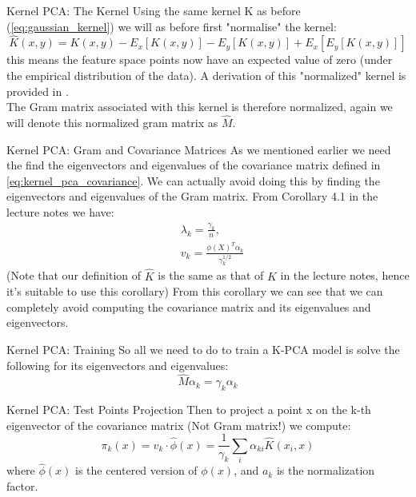 \documentclass[aspectratio=169]{beamer}
\begin{document}
\begin{frame}{Kernel PCA: The Kernel}
  Using the same kernel K as before (\cref{eq:gaussian_kernel}) we will as before first "normalise" the kernel:
  \begin{equation} \label{eq:kernel_normalization_kpca}
    \hat{K}(x,y) = K(x,y) - E_{x}[K(x,y)] - E_{y}[K(x,y)] + E_{x}[E_{y}[K(x,y)]]
  \end{equation}
  this means the feature space points now have an expected value of zero (under the empirical distribution of the data). A derivation of this "normalized" kernel is provided in \cite{bengio2003learning}.
  \\ \hfill \break
  The Gram matrix associated with this kernel is therefore normalized, again we will denote this normalized gram matrix as $\hat{M}$. 
\end{frame}

\begin{frame}{Kernel PCA: Gram and Covariance Matrices}
  As we mentioned earlier we need the find the eigenvectors and eigenvalues of the covariance matrix defined in \cref{eq:kernel_pca_covariance}. We can actually avoid doing this by finding the eigenvectors and eigenvalues of the Gram matrix. 
  From Corollary 4.1 in the lecture notes we have:
  \begin{align*}
    &{}\lambda_{k} = \frac{\gamma_{k}}{n}, \\
    &v_{k} = \frac{\phi(X)^{T} \alpha_{k}}{\gamma_{k}^{1/2}}
  \end{align*}
  (Note that our definition of $\hat{K}$ is the same as that of $K$ in the lecture notes, hence it's suitable to use this corollary) From this corollary we can see that we can completely avoid computing the covariance matrix and its eigenvalues and eigenvectors. 
\end{frame}

\begin{frame}{Kernel PCA: Training}
  So all we need to do to train a K-PCA model is solve the following for its eigenvectors and eigenvalues:
  \begin{equation*}
    \hat{M} \alpha_{k} = \gamma_{k} \alpha_{k}
  \end{equation*}
\end{frame}

\begin{frame}{Kernel PCA: Test Points Projection}
  Then to project a point x on the k-th eigenvector of the covariance matrix (Not Gram matrix!) we compute:
  \begin{equation*}
    \pi_{k}(x) = v_{k} \cdot \hat{\phi}(x) = \frac{1}{\gamma_{k}} \sum_{i} \alpha_{ki} \hat{K}(x_{i},x)
  \end{equation*}
  where $\hat{\phi}(x)$ is the centered version of $\phi(x)$, and $a_{k}$ is the normalization factor. 
\end{frame}
\end{document}
